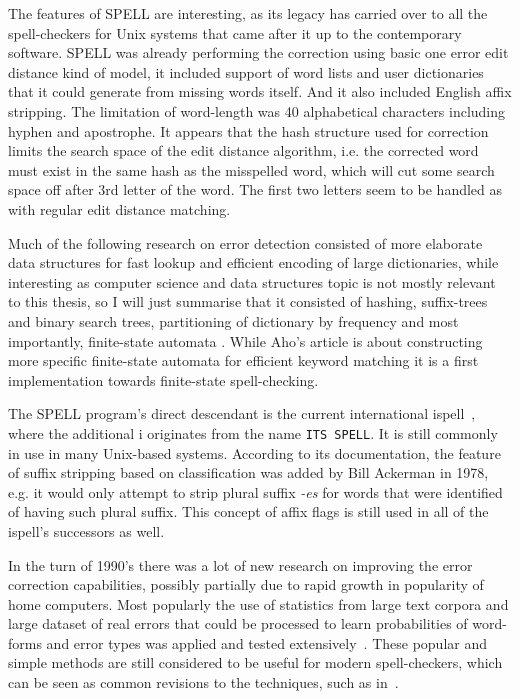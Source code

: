 \documentclass[officiallayout]{unihelcompling}
\begin{document}
The features of SPELL are interesting, as its legacy has carried over to all
the spell-checkers for Unix systems that came after it up to the contemporary
software.  SPELL was already performing the correction using basic one error
edit distance kind of model, it included support of word lists and user
dictionaries that it could generate from missing words itself. And it also
included English affix
stripping. The limitation of word-length was 40 alphabetical characters
including hyphen and apostrophe. It appears that the hash structure used for
correction limits the search space of the edit distance algorithm, i.e. the
corrected word must exist in the same hash as the misspelled word, which will
cut some search space off after 3rd letter of the word. The first two letters
seem to be handled as with regular edit distance matching.
\citep{gorin1971spell}

Much of the following research on error detection consisted of more elaborate
data structures for fast lookup and efficient encoding of large dictionaries,
while interesting as computer science and data structures topic is not mostly
relevant to this thesis, so I will just summarise that it consisted of hashing,
suffix-trees and binary search trees, partitioning of dictionary by frequency
\citep{knuth1973art} and most importantly, finite-state automata
\citep{aho1975efficient}. While Aho's article is about constructing more
specific finite-state automata for efficient keyword matching it is a first
implementation towards finite-state spell-checking.

The SPELL program's direct descendant is the current international
ispell~\citep{gorin1971spell}, where the additional i originates from the name
\texttt{ITS SPELL}. It is still commonly in use in many Unix-based systems.
According to its documentation, the feature of suffix stripping based on
classification was added by Bill Ackerman in 1978, e.g. it would only attempt
to strip plural suffix \emph{-es} for words that were identified of having such
plural suffix.  This concept of affix flags is still used in all of the
ispell's successors as well.

In the turn of 1990's there was a lot of new research on improving the error
correction capabilities, possibly partially due to rapid growth in popularity
of home computers. Most popularly the use of statistics from large text corpora
and large dataset of real errors that could be processed to learn probabilities
of word-forms and error types was applied and tested
extensively~\citep{kernighan1990spelling,church1991probability}. These popular
and simple methods are still considered to be useful for modern spell-checkers,
which can be seen as common revisions to the techniques, such as
in~\citet{brill2000improved}.
\end{document}

